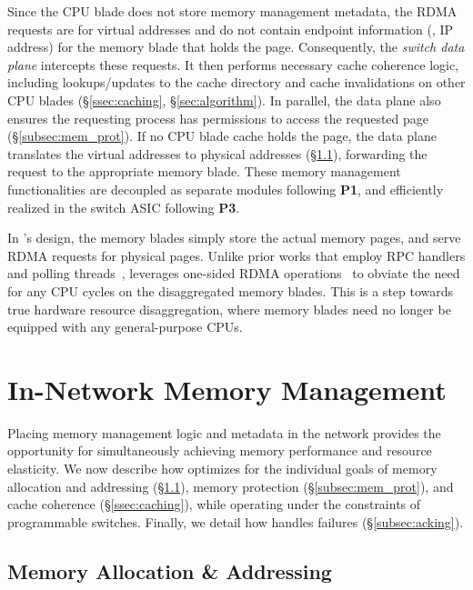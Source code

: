 Since the CPU blade does not store memory management metadata, the RDMA requests are for virtual addresses and do not contain endpoint information (\eg, IP address) for the memory blade that holds the page. Consequently, the \textit{switch data plane} intercepts these requests. It then performs necessary cache coherence logic, including lookups/updates to the cache directory and cache invalidations on other CPU blades (\S\ref{ssec:caching}, \S\ref{sec:algorithm}). In parallel, the data plane also ensures the requesting process has permissions to access the requested page (\S\ref{subsec:mem_prot}). If no CPU blade cache holds the page, the data plane translates the virtual addresses to physical addresses (\S\ref{subsec:addr_trans}), forwarding the request to the appropriate memory blade. These memory management functionalities are decoupled as separate modules following \textbf{P1}, and efficiently realized in the switch ASIC following \textbf{P3}.

In \mind's design, the memory blades simply store the actual memory pages, and serve RDMA requests for physical pages. Unlike prior works that employ RPC handlers and polling threads~\cite{legoos}, \mind leverages one-sided RDMA operations~\cite{farm} to obviate the need for any CPU cycles on the disaggregated memory blades. This is a step towards true hardware resource disaggregation, where memory blades need no longer be equipped with any general-purpose CPUs.

\section{In-Network Memory Management}
\label{sec:minddesign}

Placing memory management logic and metadata in the network provides the opportunity for simultaneously achieving memory performance and resource elasticity. We now describe how \mind optimizes for the individual goals of memory allocation and addressing (\S\ref{subsec:addr_trans}), memory protection (\S\ref{subsec:mem_prot}), and cache coherence (\S\ref{ssec:caching}), while operating under the constraints of programmable switches. Finally, we detail how \mind handles failures (\S\ref{subsec:acking}). %

\subsection{Memory Allocation \& Addressing}
\label{subsec:addr_trans}

